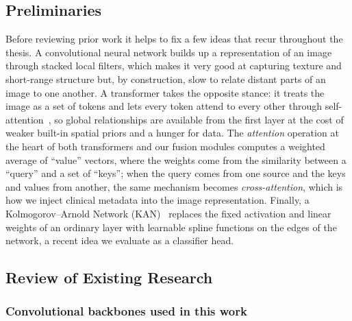 \subsection{Preliminaries}

Before reviewing prior work it helps to fix a few ideas that recur throughout
the thesis. A convolutional neural network builds up a representation of an image
through stacked local filters, which makes it very good at capturing texture and
short-range structure but, by construction, slow to relate distant parts of an
image to one another. A transformer takes the opposite stance: it treats the
image as a set of tokens and lets every token attend to every other through
self-attention~\cite{vaswani2017attention,dosovitskiy2021vit}, so global
relationships are available from the first layer at the cost of weaker built-in
spatial priors and a hunger for data. The \emph{attention} operation at the
heart of both transformers and our fusion modules computes a weighted average of
``value'' vectors, where the weights come from the similarity between a
``query'' and a set of ``keys''; when the query comes from one source and the
keys and values from another, the same mechanism becomes \emph{cross-attention},
which is how we inject clinical metadata into the image representation. Finally,
a Kolmogorov--Arnold Network (KAN)~\cite{liu2024kan} replaces the fixed
activation and linear weights of an ordinary layer with learnable spline
functions on the edges of the network, a recent idea we evaluate as a classifier
head.

\subsection{Review of Existing Research}

\subsubsection{Convolutional backbones used in this work}

